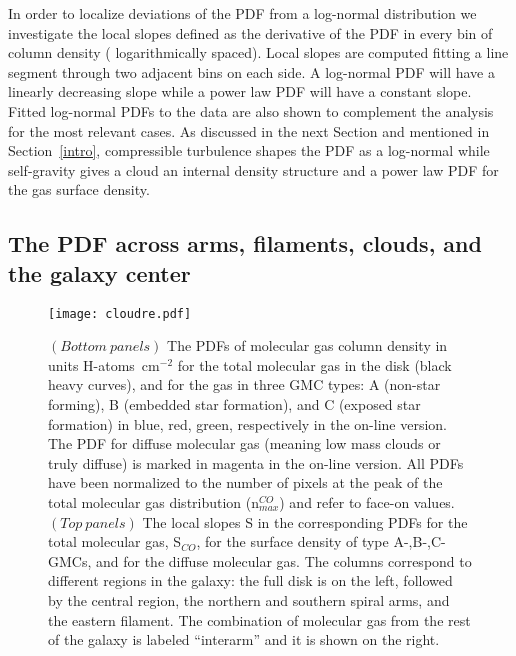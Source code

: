 \documentclass{aa}
\begin{document}
In order to localize deviations of the PDF from a log-normal distribution we investigate
the local slopes defined as the derivative of the PDF in every bin of column density
( logarithmically spaced). Local slopes are computed fitting a line segment through
 two adjacent bins on each side. A log-normal PDF will have a linearly decreasing
 slope while a power law PDF will have a constant slope. Fitted log-normal PDFs to the data
 are also shown to complement the analysis  for the most relevant cases. As discussed in
 the next Section and  mentioned in Section~\ref{intro}, compressible turbulence
 shapes the PDF as a log-normal  while self-gravity  gives a cloud an internal density 
 structure and a power law PDF for the  gas surface density.

\subsection{The PDF across arms, filaments, clouds, and the galaxy center}

\begin{figure*}
\centering
\texttt{[image: cloudre.pdf]}
\caption{$(Bottom\ panels)$ The PDFs of molecular gas column density in units H-atoms~cm$^{-2}$
for the total molecular gas in the disk (black heavy curves), and for the gas in
three GMC types: A (non-star forming), B (embedded star formation),
and C (exposed star formation) in blue, red, green, respectively in the on-line version.
The PDF for diffuse molecular gas  (meaning low mass clouds or truly diffuse) is marked in magenta
in the on-line version. All PDFs have been normalized to the number of pixels at the peak of
the total molecular gas distribution (n$^{CO}_{max}$) and refer to face-on values.
$(Top\ panels)$ The local slopes S in the corresponding PDFs
for the total molecular gas, S$_{CO}$, for the surface density of type A-,B-,C-GMCs,
and for the diffuse molecular gas.
The columns correspond to different regions in the galaxy: the full disk is on the
left, followed by the central region, the northern and southern spiral arms, and the
eastern filament. The combination of molecular gas from
the rest of the galaxy is labeled ``interarm'' and it is shown on the right.
}
\label{COPDF}
\end{figure*}
\end{document}

